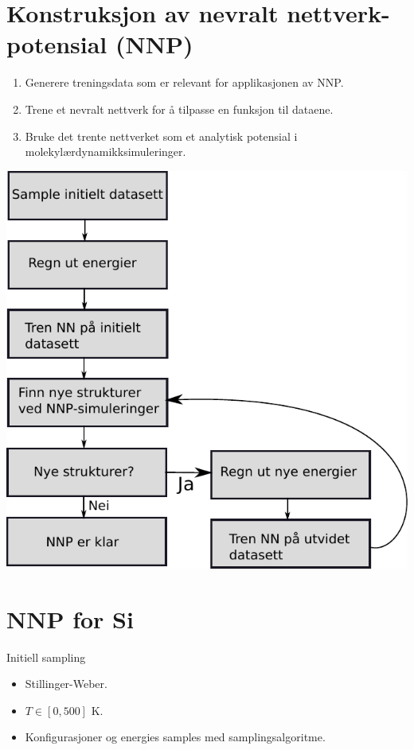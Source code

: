 \documentclass{beamer}
\begin{document}
\section{Konstruksjon av nevralt nettverk-potensial (NNP)}


\begin{frame}

\begin{enumerate}
 \item Generere treningsdata som er relevant for applikasjonen av NNP. 
 \item Trene et nevralt nettverk for å tilpasse en funksjon til dataene. 
 \item Bruke det trente nettverket som et analytisk potensial i molekylærdynamikksimuleringer. 
\end{enumerate}

\end{frame}


\begin{frame}
 
\centering
\includegraphics[width=0.7\linewidth]{../Figures/Presentation/iterativeSampling.pdf} 

\end{frame}


\section{NNP for Si}


\begin{frame}

\begin{block}{Initiell sampling}
 \begin{itemize}
  \item Stillinger-Weber. 
  \item $T \in [0,500]$ K. 
  \item Konfigurasjoner og energies samples med samplingsalgoritme.  
 \end{itemize}
\end{block}

\end{frame}
\end{document}
